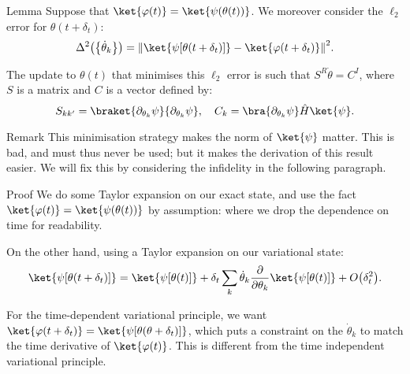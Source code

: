 \documentclass[a4paper]{article}
\begin{document}
\begin{parag}{Lemma}
    Suppose that $\ket{\phi\left(t\right)} = \ket{\psi\left(\theta\left(t\right)\right)}$. We moreover consider the $\ell_2$ error for $\theta\left(t + \delta_t\right)$:
    \[\Delta^2\left(\left\{\dot{\theta}_k\right\}\right) = \left\|\ket{\psi\left[\theta\left(t + \delta_t\right)\right]} - \ket{\phi\left(t + \delta_t\right)}\right\|^2.\]

    The update to $\theta\left(t\right)$ that minimises this $\ell_2$ error is such that $S^R \dot{\theta} = C^I$, where $S$ is a matrix and $C$ is a vector defined by: 
    \[S_{kk'} = \braket{\partial_{\theta_k}\psi}{\partial_{\theta_k} \psi}, \mathspace C_k = \bra{\partial_{\theta_k} \psi} \hat{H} \ket{\psi}.\]

    \begin{subparag}{Remark}
        This minimisation strategy makes the norm of $\ket{\psi}$ matter. This is bad, and must thus never be used; but it makes the derivation of this result easier. We will fix this by considering the infidelity in the following paragraph.
    \end{subparag}
    
    \begin{subparag}{Proof}
        We do some Taylor expansion on our exact state, and use the fact $\ket{\phi\left(t\right)} = \ket{\psi\left(\theta\left(t\right)\right)}$ by assumption: 
        where we drop the dependence on time for readability.
        
        On the other hand, using a Taylor expansion on our variational state:
        \[\ket{\psi\left[\theta\left(t + \delta_t\right)\right]} = \ket{\psi\left[\theta\left(t\right)\right]} + \delta_t \sum_{k} \dot{\theta}_k \frac{\partial}{\partial \theta_k} \ket{\psi\left[\theta\left(t\right)\right]} + O\left(\delta_t^2\right).\]

        For the time-dependent variational principle, we want $\ket{\phi\left(t+ \delta_t\right)} = \ket{\psi\left[\theta\left(\theta + \delta_t\right)\right]}$, which puts a constraint on the $\dot{\theta}_k$ to match the time derivative of $\ket{\phi\left(t\right)}$. This is different from the time independent variational principle.


\end{subparag}
\end{parag}
\end{document}
